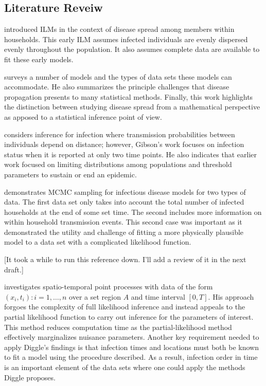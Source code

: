 \documentclass{uwstat572}
\begin{document}
\subsection{Literature Reveiw}
\cite{Haber} introduced ILMs in the context of disease spread among members within households. This early ILM assumes infected individuals are evenly dispersed evenly throughout the population. It also assumes complete data are available to fit these early models. 

\cite{Becker} surveys a number of models and the types of data sets these models can accommodate. 
He also summarizes the principle challenges that disease propagation presents to many statistical methods.
Finally, this work highlights the distinction between studying disease spread from a mathematical perspective as apposed to a statistical inference point of view.  

\cite{Gibson} considers inference for infection where transmission probabilities between individuals depend on distance; however, Gibson's work focuses on infection status when it is reported at only two time points. 
He also indicates that earlier work focused on limiting distributions among populations and threshold parameters to sustain or end an epidemic. 

\cite{ONeill} demonstrates MCMC sampling for infectious disease models for two types of data. 
The first data set only takes into account the total number of infected households at the end of some set time.
The second includes more information on within household transmission events.
This second case was important as it demonstrated the utility and challenge of fitting a more physically plausible model to a data set with a complicated likelihood function.

\cite{McKinley} [It took a while to run this reference down. I'll add a review of it in the next draft.]

\cite{Diggle} investigates spatio-temporal point processes with data of the form $(x_i, t_i): i=1, \dots, n$ over a set region $A$ and time interval $[0, T]$. 
His approach forgoes the complexity of full likelihood inference and instead appeals to the partial likelihood function to carry out inference for the parameters of interest. 
This method reduces computation time as the partial-likelihood method effectively marginalizes nuisance parameters. 
Another key requirement needed to apply Diggle's findings is that infection times and locations must both be known to fit a model using the procedure described.
As a result, infection order in time is an important element of the data sets where one could apply the methods Diggle proposes. 
\end{document}
